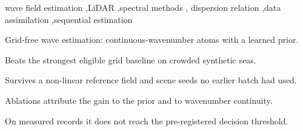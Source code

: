 \documentclass[review]{elsarticle}
\begin{document}
\begin{frontmatter}
\begin{keyword}
wave field estimation \sep LiDAR \sep spectral methods \sep
dispersion relation \sep data assimilation \sep sequential estimation
\end{keyword}

\begin{highlights}
\item Grid-free wave estimation: continuous-wavenumber atoms with a learned prior.
\item Beats the strongest eligible grid baseline on crowded synthetic seas.
\item Survives a non-linear reference field and scene seeds no earlier batch had used.
\item Ablations attribute the gain to the prior and to wavenumber continuity.
\item On measured records it does not reach the pre-registered decision threshold.
\end{highlights}

\end{frontmatter}

\linenumbers
\end{document}
